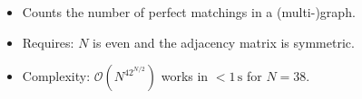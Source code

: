 \begin{itemize}
  \item Counts the number of perfect matchings in a (multi-)graph.
  \item Requires: $N$ is even and the adjacency matrix is symmetric.
  \item Complexity: $\mathcal{O}(N^42^{N/2})$ works in $<1\,\mathrm{s}$ for $N = 38$.
\end{itemize}